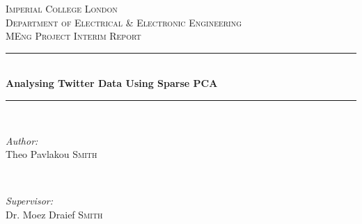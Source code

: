 \documentclass[11pt,a4paper]{article}
\begin{document}
\begin{titlepage}

\newcommand{\HRule}{\rule{\linewidth}{0.5mm}} %

\center %
 

\textsc{\LARGE Imperial College London}\\[1.5cm] %
\textsc{\Large Department of Electrical \& Electronic Engineering}\\[0.5cm] %
\textsc{\large MEng Project Interim Report}\\[0.5cm] %


\HRule \\[0.4cm]
{ \huge \bfseries Analysing Twitter Data Using Sparse PCA}\\[0.4cm] %
\HRule \\[1.5cm]
 

\begin{minipage}{0.4\textwidth}
\begin{flushleft} \large
\emph{Author:}\\
Theo Pavlakou \textsc{Smith} %
\end{flushleft}
\end{minipage}
~
\begin{minipage}{0.4\textwidth}
\begin{flushright} \large
\emph{Supervisor:} \\
Dr. Moez Draief \textsc{Smith} %
\end{flushright}
\end{minipage}\\[4cm]



\end{titlepage}
\end{document}
